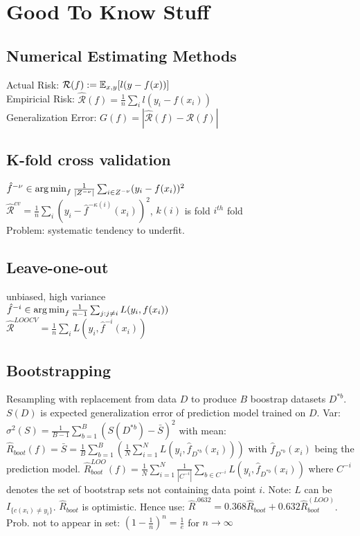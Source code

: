 \section{Good To Know Stuff}
\subsection*{Numerical Estimating Methods}
Actual Risk: $\mathcal{R}(f) := \mathbb{E}_{x,y}[l(y-f(x))]$ \\
Empiricial Risk: $\hat{\mathcal{R}}(f) = \frac{1}{n}\sum_i l(y_i - f(x_i))$\\
Generalization Error: $G(f) = |\hat{\mathcal{R}}(f) - \mathcal{R}(f)|$

\subsection*{K-fold cross validation}
$\hat{f}^{-\nu} \in \operatorname*{arg\,min}_f \frac{1}{|Z^{-\nu}|} \sum_{i \in Z^{-\nu}} (y_i - f(x_i))^2$\\
$\hat{\mathcal{R}}^{cv} = \frac{1}{n} \sum_i(y_i - \hat{f}^{-\kappa(i)}(x_i))^2$, $k(i)$ is fold $i^{th}$ fold \\
Problem: systematic tendency to underfit.

\subsection*{Leave-one-out}
unbiased, high variance \\
$\hat{f}^{-i} \in \operatorname*{arg\,min}_f \frac{1}{n-1} \sum_{j:j \neq i} L(y_i,f(x_i))$ \\
$\hat{\mathcal{R}}^{LOOCV} = \frac{1}{n} \sum_i L(y_i, \hat{f}^{-i}(x_i))$

\subsection*{Bootstrapping}
Resampling with replacement from data $D$ to produce $B$ boostrap datasets $D^{*b}$.  $S(D)$ is expected generalization error of prediction model trained on $D$. Var: $\sigma ^2(S) = \frac{1}{B-1}\sum_{b=1}^B(S(D^{*b})-\bar{S})^2$ with mean: $\hat{R}_{boot}(f)=\bar{S}=\frac{1}{B}\sum_{b=1}^B(\frac{1}{N}\sum_{i=1}^NL(y_i,\hat{f}_{D^{*b}}(x_i)))$ with $\hat{f}_{D^{*b}}(x_i)$ being the prediction model. $\hat{R}_{boot}^{LOO}(f) = \frac{1}{N}\sum_{i=1}^N\frac{1}{|C^{-i}|}\sum_{b\in C^{-i}}L(y_i,\hat{f}_{D^{*b}}(x_i))$ where $C^{-i}$ denotes the set of bootstrap sets not containing data point $i$. Note: $L$ can be $I_{\{c(x_i)\not =y_i\}}$.
$\hat{R}_{boot}$ is optimistic. Hence use: $\hat{R}^{.0632}=0.368\hat{R}_{boot}+0.632\hat{R}_{boot}^{(LOO)}$. \\
Prob. not to appear in set: $(1-\frac{1}{n})^n = \frac{1}{e}$ for $n \rightarrow \infty$

